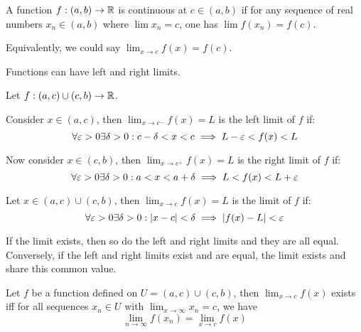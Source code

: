 \documentclass[a4paper,10pt]{article}
\begin{document}
\begin{defn}[Continuous]
	A function $f: (a,b) \to \mathbb{R}$ is continuous at $c \in (a,b)$
	if for any sequence of real numbers $x_n \in (a,b)$ where $\lim
	x_n = c$, one has $\lim f(x_n) = f(c)$.

	Equivalently, we could say $\lim_{x \to c} f(x) = f(c)$.

\end{defn}

\begin{defn}
	Functions can have left and right limits.

	Let $f: (a,c) \cup (c,b) \to \mathbb{R}$.

	Consider $x \in (a,c)$, then $\lim_{x \to c^-} f(x) = L$ is the
	left limit of $f$ if:
	\[
		\forall \varepsilon > 0 \exists \delta > 0 :
		c - \delta < x < c \implies L - \varepsilon < f(x) < L
	\]

	Now consider $x \in (c,b)$, then $\lim_{x \to c^+} f(x) = L$ is
	the right limit of $f$ if:
	\[
		\forall \varepsilon > 0 \exists \delta > 0 :
		a < x < a + \delta \implies L < f(x) < L + \varepsilon
	\]

	Let $x \in (a,c) \cup (c,b)$, then $\lim_{x \to c} f(x) = L$ is
	the limit of $f$ if:
	\[
		\forall \varepsilon > 0 \exists \delta > 0 :
		|x-c| < \delta \implies |f(x) - L| < \varepsilon
	\]

	If the limit exists, then so do the left and right limits and they are
	all equal. Conversely, if the left and right limits exist and are equal,
	the limit exists and share this common value.
\end{defn}

\begin{thm}
	Let $f$ be a function defined on $U = (a,c) \cup (c,b)$, then
	$\lim_{x \to c}f(x)$ exists iff for all sequences $x_n \in U$
	with $\lim_{x \to \infty} x_n = c$, we have
	\[
		\lim_{n \to \infty} f(x_n) = \lim_{x \to c} f(x)
	\]
\end{thm}
\end{document}
